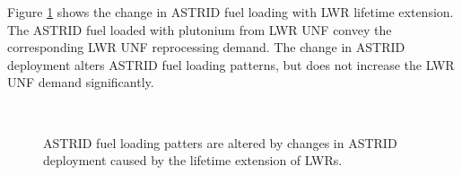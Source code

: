 Figure \ref{fig:ext_fuel} shows the change in \gls{ASTRID} fuel loading with
\gls{LWR} lifetime extension. The \gls{ASTRID} fuel loaded with plutonium
from \gls{LWR} \gls{UNF} convey the corresponding \gls{LWR} \gls{UNF} reprocessing demand.
The change in \gls{ASTRID} deployment alters \gls{ASTRID} fuel loading patterns,
but does not increase the \gls{LWR} \gls{UNF} demand significantly.

\begin{figure}[!ht]
	\centering
	\quad
	\\
	\quad
	\caption{\gls{ASTRID} fuel loading patters are altered by changes in \gls{ASTRID} deployment
			 caused by the lifetime extension of \glspl{LWR}.}
	\label{fig:ext_fuel}
\end{figure}

